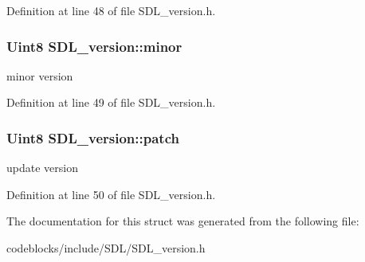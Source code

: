 Definition at line 48 of file S\+D\+L\+\_\+version.\+h.

\hypertarget{structSDL__version_a6c35c7bf80245028d5970e6a504ecf57}{
\subsubsection[{minor}]{\setlength{\rightskip}{0pt plus 5cm}Uint8 S\+D\+L\+\_\+version\+::minor}}\label{structSDL__version_a6c35c7bf80245028d5970e6a504ecf57}
minor version 

Definition at line 49 of file S\+D\+L\+\_\+version.\+h.

\hypertarget{structSDL__version_aa6dacff18edee8cd037c773b843be0f1}{
\subsubsection[{patch}]{\setlength{\rightskip}{0pt plus 5cm}Uint8 S\+D\+L\+\_\+version\+::patch}}\label{structSDL__version_aa6dacff18edee8cd037c773b843be0f1}
update version 

Definition at line 50 of file S\+D\+L\+\_\+version.\+h.



The documentation for this struct was generated from the following file\+:\begin{DoxyCompactItemize}
\item 
codeblocks/include/\+S\+D\+L/S\+D\+L\+\_\+version.\+h\end{DoxyCompactItemize}
